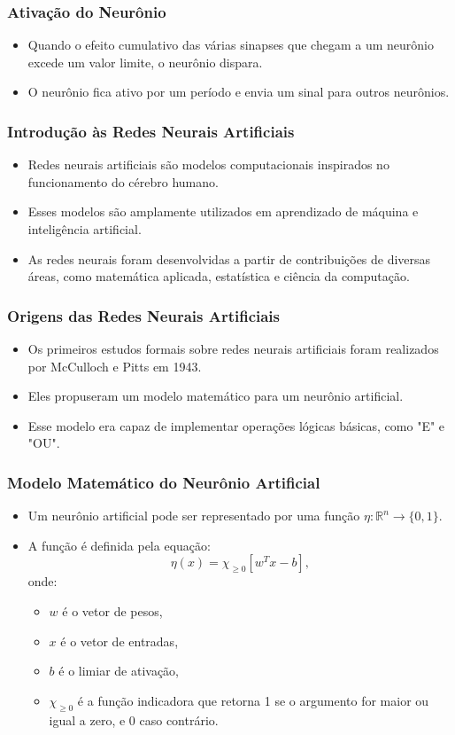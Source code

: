 \documentclass[aspectratio=169]{beamer}
\begin{document}
\begin{frame}
\frametitle{Ativação do Neurônio}
\begin{itemize}
    \item Quando o efeito cumulativo das várias sinapses que chegam a um neurônio excede um valor limite, o neurônio dispara.
    \item O neurônio fica ativo por um período e envia um sinal para outros neurônios.
\end{itemize}
\end{frame}

\begin{frame}
\frametitle{Introdução às Redes Neurais Artificiais}
\begin{itemize}
    \item Redes neurais artificiais são modelos computacionais inspirados no funcionamento do cérebro humano.
    \item Esses modelos são amplamente utilizados em aprendizado de máquina e inteligência artificial.
    \item As redes neurais foram desenvolvidas a partir de contribuições de diversas áreas, como matemática aplicada, estatística e ciência da computação.
\end{itemize}
\end{frame}

\begin{frame}
\frametitle{Origens das Redes Neurais Artificiais}
\begin{itemize}
    \item Os primeiros estudos formais sobre redes neurais artificiais foram realizados por McCulloch e Pitts em 1943.
    \item Eles propuseram um modelo matemático para um neurônio artificial.
    \item Esse modelo era capaz de implementar operações lógicas básicas, como "E" e "OU".
\end{itemize}
\end{frame}

\begin{frame}
\frametitle{Modelo Matemático do Neurônio Artificial}
\begin{itemize}
    \item Um neurônio artificial pode ser representado por uma função \( \eta : \mathbb{R}^n \rightarrow \{0, 1\} \).
    \item A função é definida pela equação:
    \[
    \eta(x) = \chi_{\geq 0} \left[ w^T x - b \right],
    \]
    onde:
    \begin{itemize}
        \item \( w \) é o vetor de pesos,
        \item \( x \) é o vetor de entradas,
        \item \( b \) é o limiar de ativação,
        \item \( \chi_{\geq 0} \) é a função indicadora que retorna 1 se o argumento for maior ou igual a zero, e 0 caso contrário.
    \end{itemize}
\end{itemize}
\end{frame}
\end{document}
